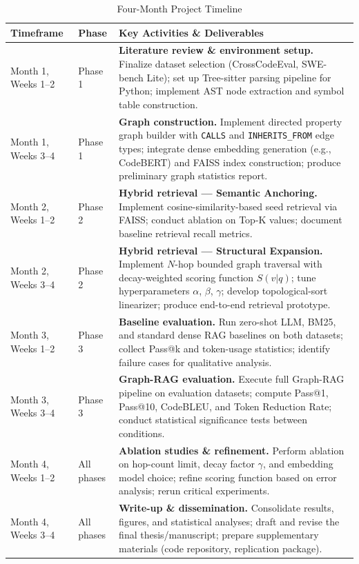 \documentclass[11pt, a4paper]{article}
\begin{document}
\begin{table}[H]
\centering
\caption{Four-Month Project Timeline}
\label{tab:timeline}
\begin{tabular}{@{}p{2.2cm} p{2.4cm} p{8.5cm}@{}}
\toprule
\textbf{Timeframe} & \textbf{Phase} & \textbf{Key Activities \& Deliverables} \\
\midrule
Month 1, Weeks 1--2 & Phase 1 & \textbf{Literature review \& environment setup.} Finalize dataset selection (CrossCodeEval, SWE-bench Lite); set up Tree-sitter parsing pipeline for Python; implement AST node extraction and symbol table construction. \\
\addlinespace
Month 1, Weeks 3--4 & Phase 1 & \textbf{Graph construction.} Implement directed property graph builder with \texttt{CALLS} and \texttt{INHERITS\_FROM} edge types; integrate dense embedding generation (e.g., CodeBERT) and FAISS index construction; produce preliminary graph statistics report. \\
\midrule
Month 2, Weeks 1--2 & Phase 2 & \textbf{Hybrid retrieval — Semantic Anchoring.} Implement cosine-similarity-based seed retrieval via FAISS; conduct ablation on Top-K values; document baseline retrieval recall metrics. \\
\addlinespace
Month 2, Weeks 3--4 & Phase 2 & \textbf{Hybrid retrieval — Structural Expansion.} Implement $N$-hop bounded graph traversal with decay-weighted scoring function $S(v|q)$; tune hyperparameters $\alpha$, $\beta$, $\gamma$; develop topological-sort linearizer; produce end-to-end retrieval prototype. \\
\midrule
Month 3, Weeks 1--2 & Phase 3 & \textbf{Baseline evaluation.} Run zero-shot LLM, BM25, and standard dense RAG baselines on both datasets; collect Pass@k and token-usage statistics; identify failure cases for qualitative analysis. \\
\addlinespace
Month 3, Weeks 3--4 & Phase 3 & \textbf{Graph-RAG evaluation.} Execute full Graph-RAG pipeline on evaluation datasets; compute Pass@1, Pass@10, CodeBLEU, and Token Reduction Rate; conduct statistical significance tests between conditions. \\
\midrule
Month 4, Weeks 1--2 & All phases & \textbf{Ablation studies \& refinement.} Perform ablation on hop-count limit, decay factor $\gamma$, and embedding model choice; refine scoring function based on error analysis; rerun critical experiments. \\
\addlinespace
Month 4, Weeks 3--4 & All phases & \textbf{Write-up \& dissemination.} Consolidate results, figures, and statistical analyses; draft and revise the final thesis/manuscript; prepare supplementary materials (code repository, replication package). \\
\bottomrule
\end{tabular}
\end{table}
\end{document}
